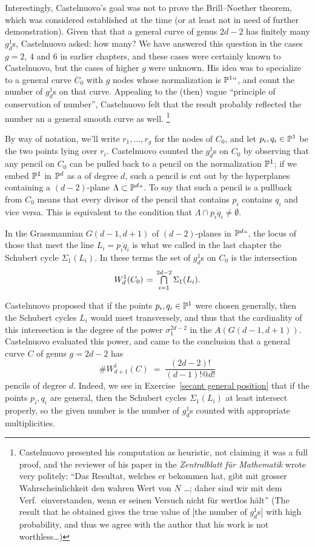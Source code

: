 Interestingly, Castelnuovo's goal was not to prove the Brill--Noether
theorem, which was considered established at the time (or at least not
in need of further demonstration). Given that
that a general curve of genus $2d-2$ has finitely many $g^{1}_{d}$s,
Castelnuovo asked: how many? We have answered this question in 
the
cases $g = 2$, $4$ and 6 in earlier chapters, 
and these cases were certainly known to Castelnuovo, 
but the cases of higher $g$ were unknown.
His idea was to specialize to a general curve $C_0$ with $g$ nodes
whose normalization is ${\mathbb P}^1` `$, and count the number of $g^1_d$s on
that curve. Appealing to the (then) vague ``principle of conservation
%
of number'', Castelnuovo felt that the result probably reflected the
number an a general smooth curve as well.%
%
\footnote{Castelnuovo
  presented his computation as heuristic, not claiming it was a full
  proof, and the reviewer of 
his
paper in the \textit{Zentralblatt 
f\"ur Mathematik} 
wrote very politely: 
``Das Resultat, welches er bekommen hat, gibt mit grosser
Wahrscheinlichkeit den wahren Wert von $N$ \dots; daher sind wir mit dem
Verf.\ einverstanden, wenn er seinen Versuch nicht f\"ur wertlos h\"alt''
(The result that he obtained gives the true value of [the number of
$g^1_d$s] with high probability, and thus we agree with the author that
his work is not worthless\dots)}

By way of notation, we'll write $r_1,\dots,r_g$ for the nodes of
$C_0$, and let $p_i, q_i \in {\mathbb P}^1$ be the two points lying over $r_i$.
Castelnuovo counted the $g^1_d$s on $C_0$ by observing that any pencil
on $C_0$ can be pulled back to a pencil on the normalization ${\mathbb P}^1$;
if we embed ${\mathbb P}^1$ in ${\mathbb P}^d$ as a
%
of degree $d$, such a pencil is cut out by the hyperplanes containing
 a $(d-2)$-plane $\Lambda \subset {\mathbb P}^d``$.
To say that such a pencil is a pullback from $C_0$ means that every
divisor of the pencil that contains $p_i$ contains $q_i$ and vice
versa. This  is equivalent to the condition that $\Lambda \cap
\overline{p_iq_i} \neq \emptyset$.

In the Grassmannian $G(d-1, d+1)$ of $(d-2)$-planes in ${\mathbb P}^d``$,
the locus of those that meet the line $L_i = \overline{p_iq_i}$ is
what we called in the last chapter the Schubert cycle $\Sigma_1(L_i)$.
In these terms the set of $g^1_d$s on $C_0$ is the intersection
$$
W^1_d(C_0) \; = \; \tsty\bigcap\limits_{i=1}^{2d-2} \Sigma_1(L_i).
$$

Castelnuovo proposed that if the points $p_i, q_i\in {\mathbb P}^1$ were chosen
generally, then the Schubert cycles
$L_i$ would meet transversely, and thus that the cardinality of this
intersection is the degree of the power $\sigma_1^{2d-2}$ in the 
%
$A(G(d-1, d+1))$. Castelnuovo evaluated this power, and came to
the conclusion that a general curve $C$ of genus $g=2d-2$ has
$$
\#W^1_{d+1}(C) \; = \; \frac{(2d-2)!}{(d-1)!@d!}
$$
pencils of degree $d$. Indeed, we see
 in Exercise~\ref{secant general position} that if the points $p_i, q_i$
 are general, then the Schubert cycles $\Sigma_1(L_i)$ at least intersect
 properly, so the given number is the number of $g^1_d$s counted with
 appropriate multiplicities.

